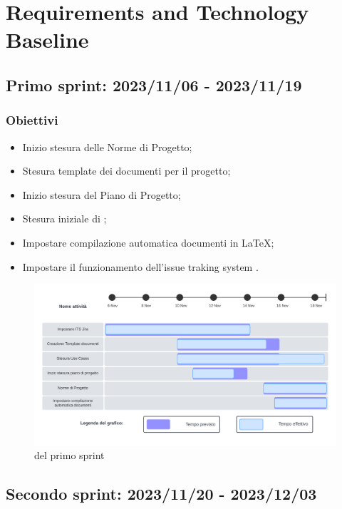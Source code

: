 \section{Requirements and Technology Baseline}
\label{pianificazione:rtb}

\subsection{Primo sprint: 2023/11/06 - 2023/11/19}
\subsubsection{Obiettivi}
\begin{itemize} 
    \item Inizio stesura delle Norme di Progetto;
    \item Stesura template dei documenti per il progetto;
    \item Inizio stesura del Piano di Progetto;
    \item Stesura iniziale di ;
    \item Impostare compilazione automatica documenti in LaTeX;
    \item Impostare il funzionamento dell'issue traking system .
\end{itemize}

\begin{figure}[h!]
    \centering  
    \includegraphics[width=\textwidth]{Roadmap1sprint.png}
    \caption{ del primo sprint}
    \label{fig:roadmap1s}
\end{figure}
\newpage

\subsection{Secondo sprint: 2023/11/20 - 2023/12/03}
